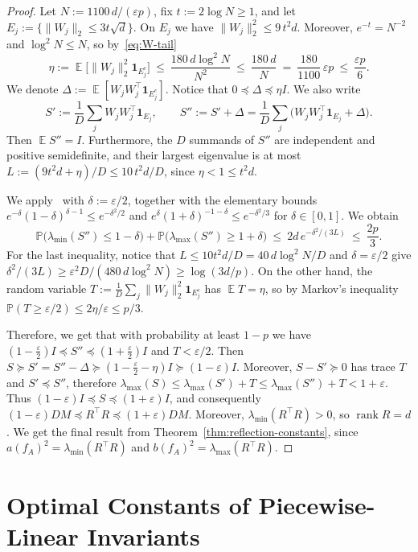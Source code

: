 \documentclass[11pt]{article}
\theoremstyle{definition}
\DeclareMathOperator{\EX}{\mathbb{E}}
\begin{document}
\begin{proof}
	 Let $N:=1100\,d/(\varepsilon p)$, fix $t:=2\log N\ge1$, and let
	$E_j:=\{\|W_j\|_2\le3t\sqrt d\}$. On $E_j$ we have $\|W_j\|_2^2\le9\,t^2d$. Moreover,
	$e^{-t}=N^{-2}$ and $\log^2N\le N$, so by~\eqref{eq:W-tail}
	\[
	\eta:=\EX\bigl[\|W_j\|_2^2\mathbf 1_{E_j^c}\bigr]\ \le\ \frac{180\,d\log^2N}{N^2}
	\ \le\ \frac{180\,d}{N}\ =\ \frac{180}{1100}\,\varepsilon p\ \le\ \frac{\varepsilon p}{6}.
	\]
	We denote $\Delta:=\EX[W_jW_j^{\!\top}\mathbf 1_{E_j^c}]$.
	Notice that $0\preceq\Delta\preceq\eta I$. We also write
	\[
	S':=\frac1D\sum_jW_jW_j^{\!\top}\mathbf 1_{E_j},\qquad
	S'':=S'+\Delta=\frac1D\sum_j\bigl(W_jW_j^{\!\top}\mathbf 1_{E_j}+\Delta\bigr).
	\]
	Then $\EX S''=I$. Furthermore, the $D$ summands of $S''$ are independent and positive
	semidefinite, and their largest eigenvalue is at most $L:=(9t^2d+\eta)/D\le10\,t^2d/D$, since
	$\eta<1\le t^2d$.
	
	We apply~\cite[Thm.~1.1]{tropp2012user} with $\delta:=\varepsilon/2$, together with
	the elementary bounds $e^{-\delta}(1-\delta)^{\delta-1}\le e^{-\delta^2/2}$ and
	$e^{\delta}(1+\delta)^{-1-\delta}\le e^{-\delta^2/3}$ for $\delta\in[0,1]$. We obtain
	\[
	\mathbb{P}\bigl(\lambda_{\min}(S'')\le1-\delta\bigr)
	+\mathbb{P}\bigl(\lambda_{\max}(S'')\ge1+\delta\bigr)\ \le\ 2d\,e^{-\delta^2/(3L)}
	\ \le\ \frac{2p}{3}.
	\]
	For the last inequality, notice that $L\le10t^2d/D=40\,d\log^2N/D$ and $\delta=\varepsilon/2$
	give $\delta^2/(3L)\ge\varepsilon^2D/(480\,d\log^2N)\ge\log(3d/p)$.
	On the other hand, the random variable
	$T:=\frac1D\sum_j\|W_j\|_2^2\mathbf 1_{E_j^c}$ has $\EX T=\eta$, so by Markov's inequality
	$\mathbb{P}(T\ge\varepsilon/2)\le2\eta/\varepsilon\le p/3$.
	
	Therefore, we get that with probability at least $1-p$ we have
	$(1-\frac\varepsilon2)I\preceq S''\preceq(1+\frac\varepsilon2)I$ and $T<\varepsilon/2$. Then
	$S\succeq S'=S''-\Delta\succeq(1-\frac\varepsilon2-\eta)I\succeq(1-\varepsilon)I$. Moreover,
	$S-S'\succeq0$ has trace $T$ and $S'\preceq S''$, therefore
	$\lambda_{\max}(S)\le\lambda_{\max}(S')+T\le\lambda_{\max}(S'')+T<1+\varepsilon$. Thus
	$(1-\varepsilon)I\preceq S\preceq(1+\varepsilon)I$, and consequently
	$(1-\varepsilon)DM\preceq R^{\!\top}R\preceq(1+\varepsilon)DM$. Moreover,
	$\lambda_{\min}(R^{\!\top}R)>0$, so $\operatorname{rank}R=d$. We get the final result
	from Theorem~\ref{thm:reflection-constants}, since $a(f_A)^2=\lambda_{\min}(R^{\!\top}R)$ and
	$b(f_A)^2=\lambda_{\max}(R^{\!\top}R)$.
\end{proof}

\section{Optimal Constants of Piecewise-Linear Invariants}\label{sec:formula}
\end{document}
